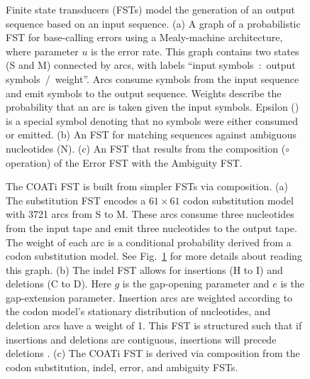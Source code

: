 \documentclass[12pt,letterpaper]{article}
\begin{document}
\begin{figure}[ht]
    \centering
    \par
    \caption{%
    Finite state transducers (FSTs) model the generation of an output sequence based on an input sequence.
    (a) A graph of a probabilistic FST \citep{cotterell-etal-2014-stochastic} for base-calling errors using a Mealy-machine architecture, where parameter $u$ is the error rate. This graph contains two states (S and M) connected by arcs, with labels ``input symbols~:~output symbols~/~weight''. Arcs consume symbols from the input sequence and emit symbols to the output sequence. Weights describe the probability that an arc is taken given the input symbols. Epsilon (\textepsilon) is a special symbol denoting that no symbols were either consumed or emitted.
    (b) An FST for matching sequences against ambiguous nucleotides (N). 
    (c) An FST that results from the composition ($\circ$ operation) of the Error FST with the Ambiguity FST.
    \label{fig:base-calling}}
\end{figure}

\begin{figure}[ht]
\caption{The COATi FST is built from simpler FSTs via composition.
(a) The substitution FST encodes a $61 \times 61 $ codon substitution model with 3721 arcs from S to M. These arcs consume three nucleotides from the input tape and emit three nucleotides to the output tape. The weight of each arc is a conditional probability derived from a codon substitution model. See Fig.~\ref{fig:base-calling} for more details about reading this graph.
%
(b) The indel FST allows for insertions (H to I) and deletions (C to D). Here $g$ is the gap-opening parameter and $e$ is the gap-extension parameter.
Insertion arcs are weighted according to the codon model's stationary distribution of nucleotides, and deletion arcs have a weight of 1. This FST is structured such that if insertions and deletions are contiguous, insertions will precede deletions \citep[Cf.][]{holmes2001evolutionary,demaio2021cumulative}.
%
(c) The COATi FST is derived via composition from the codon substitution, indel, error, and ambiguity FSTs.
\label{fig:coati-fst}}
\end{figure}
\end{document}
